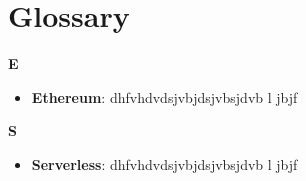 \section{Glossary}
\textbf{E}
\begin{itemize}
	\item \textbf{Ethereum}: dhfvhdvdsjvbjdsjvbsjdvb l jbjf
\end{itemize}
\textbf{S}
\begin{itemize}
	\item \textbf{Serverless}: dhfvhdvdsjvbjdsjvbsjdvb l jbjf
\end{itemize}
